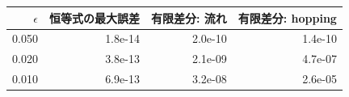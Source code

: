 \begin{tabular}{rrrr}\toprule
$\epsilon$ & 恒等式の最大誤差 & 有限差分: 流れ & 有限差分: hopping\\\midrule
0.050 & 1.8e-14 & 2.0e-10 & 1.4e-10 \\
0.020 & 3.8e-13 & 2.1e-09 & 4.7e-07 \\
0.010 & 6.9e-13 & 3.2e-08 & 2.6e-05 \\
\bottomrule\end{tabular}
